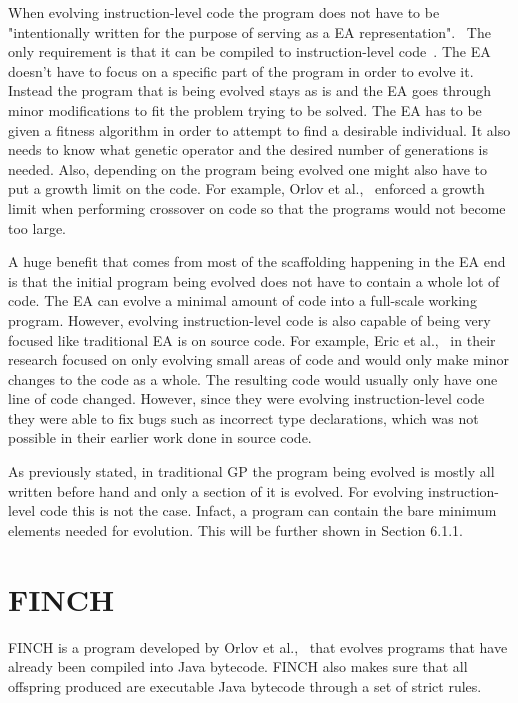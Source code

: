 \documentclass{sig-alternate}
\begin{document}
When evolving instruction-level code the program does not have to be "intentionally written for the purpose of serving as a EA representation".~\cite{FINCH2:2009} The only requirement is that it can be compiled to instruction-level code~\cite{FINCH2:2009, Assembly:2010}. The EA doesn't have to focus on a specific part of the program in order to evolve it. Instead the program that is being evolved stays as is and the EA goes through minor modifications to fit the problem trying to be solved. The EA has to be given a fitness algorithm in order to attempt to find a desirable individual. It also needs to know what genetic operator and the desired number of generations is needed. Also, depending on the program being evolved one might also have to put a growth limit on the code. For example, Orlov et al.,~\cite{FINCH:2011} enforced a growth limit when performing crossover on code so that the programs would not become too large. 

A huge benefit that comes from most of the scaffolding happening in the EA end is that the initial program being evolved does not have to contain a whole lot of code. The EA can evolve a minimal amount of code into a full-scale working program. However, evolving instruction-level code is also capable of being very focused like traditional EA is on source code. For example, Eric et al.,~\cite{Assembly:2010} in their research focused on only evolving small areas of code and would only make minor changes to the code as a whole. The resulting code would usually only have one line of code changed. However, since they were evolving instruction-level code they were able to fix bugs such as incorrect type declarations, which was not possible in their earlier work done in source code. 

As previously stated, in traditional GP the program being evolved is mostly all written before hand and only a section of it is evolved. For evolving instruction-level code this is not the case. Infact, a program can contain the bare minimum elements needed for evolution. This will be further shown in Section 6.1.1. 


\section{FINCH}
FINCH is a program developed by Orlov et al.,~\cite{FINCH2:2009,FINCH:2011} that evolves programs that have already been compiled into Java bytecode. FINCH also makes sure that all offspring produced are executable Java bytecode through a set of strict rules. 
\end{document}

